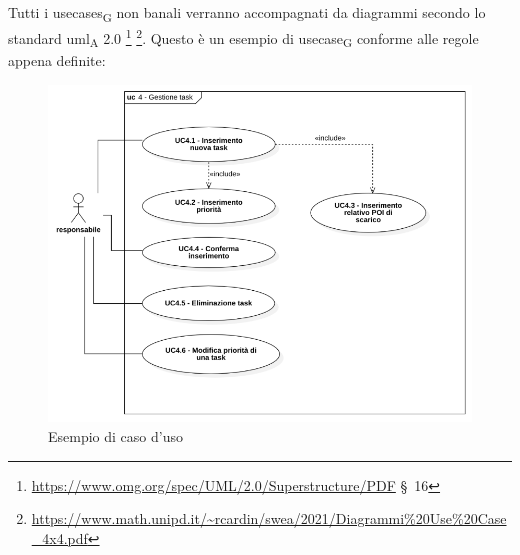                 Tutti i \glspl{usecase}\textsubscript{G} non banali verranno accompagnati da diagrammi secondo lo standard \acrshort{uml}\textsubscript{A} 2.0 \footnote{\url{https://www.omg.org/spec/UML/2.0/Superstructure/PDF} \S\ 16} \footnote{\url{https://www.math.unipd.it/~rcardin/swea/2021/Diagrammi\%20Use\%20Case_4x4.pdf}}.
                Questo è un esempio di \gls{usecase}\textsubscript{G} conforme alle regole appena definite:
                \begin{figure}[H]
                    \centering
                    \includegraphics[scale=0.5]{res/images/esempio_use_case.png}
                    \caption{Esempio di caso d'uso}
                \end{figure}

